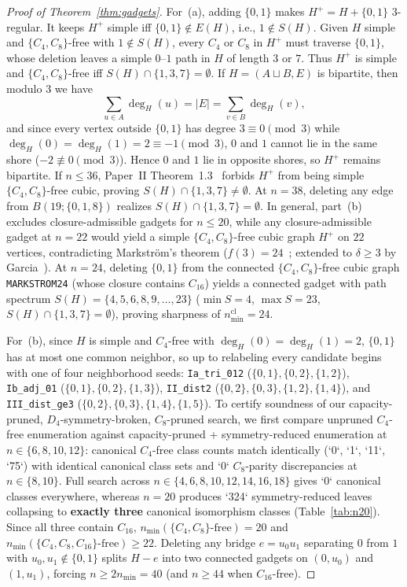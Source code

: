 \documentclass[11pt]{amsart}
\theoremstyle{definition}
\theoremstyle{remark}
\begin{document}
\begin{proof}[Proof of Theorem~\ref{thm:gadgets}]
For~(a), adding $\{0,1\}$ makes $H^+ = H + \{0,1\}$ $3$-regular. It keeps $H^+$ simple iff $\{0,1\} \notin E(H)$, i.e., $1 \notin S(H)$. Given $H$ simple and $\{C_4, C_8\}$-free with $1 \notin S(H)$, every $C_4$ or $C_8$ in $H^+$ must traverse $\{0,1\}$, whose deletion leaves a simple $0\text{--}1$ path in $H$ of length $3$ or $7$. Thus $H^+$ is simple and $\{C_4, C_8\}$-free iff $S(H) \cap \{1,3,7\} = \emptyset$. If $H = (A \sqcup B, E)$ is bipartite, then modulo $3$ we have
\[
\sum_{u \in A} \deg_H(u) = |E| = \sum_{v \in B} \deg_H(v),
\]
and since every vertex outside $\{0,1\}$ has degree $3 \equiv 0 \pmod 3$ while $\deg_H(0) = \deg_H(1) = 2 \equiv -1 \pmod 3$, $0$ and $1$ cannot lie in the same shore ($-2 \not\equiv 0 \pmod 3$). Hence $0$ and $1$ lie in opposite shores, so $H^+$ remains bipartite. If $n \le 36$, Paper~II Theorem~1.3~\cite{Paper2} forbids $H^+$ from being simple $\{C_4, C_8\}$-free cubic, proving $S(H) \cap \{1,3,7\} \ne \emptyset$. At $n = 38$, deleting any edge from $B(19; \{0,1,8\})$ realizes $S(H) \cap \{1,3,7\} = \emptyset$. In general, part~(b) excludes closure-admissible gadgets for $n \le 20$, while any closure-admissible gadget at $n = 22$ would yield a simple $\{C_4, C_8\}$-free cubic graph $H^+$ on $22$ vertices, contradicting Markstr\"om's theorem ($f(3) = 24$~\cite{Markstrom2004}; extended to $\delta \ge 3$ by Garcia~\cite{Garcia2026}). At $n = 24$, deleting $\{0,1\}$ from the connected $\{C_4, C_8\}$-free cubic graph \texttt{MARKSTROM24} (whose closure contains $C_{16}$) yields a connected gadget with path spectrum $S(H) = \{4, 5, 6, 8, 9, \dots, 23\}$ ($\min S = 4$, $\max S = 23$, $S(H) \cap \{1,3,7\} = \emptyset$), proving sharpness of $n_{\min}^{\mathrm{cl}} = 24$.

For~(b), since $H$ is simple and $C_4$-free with $\deg_H(0)=\deg_H(1)=2$, $\{0,1\}$ has at most one common neighbor, so up to relabeling every candidate begins with one of four neighborhood seeds: \texttt{Ia\_tri\_012} ($\{0,1\},\{0,2\},\{1,2\}$), \texttt{Ib\_adj\_01} ($\{0,1\},\{0,2\},\{1,3\}$), \texttt{II\_dist2} ($\{0,2\},\{0,3\},\{1,2\},\{1,4\}$), and \texttt{III\_dist\_ge3} ($\{0,2\},\{0,3\},\{1,4\},\{1,5\}$). To certify soundness of our capacity-pruned, $D_4$-symmetry-broken, $C_8$-pruned search, we first compare unpruned $C_4$-free enumeration against capacity-pruned + symmetry-reduced enumeration at $n \in \{6, 8, 10, 12\}$: canonical $C_4$-free class counts match identically (`0`, `1`, `11`, `75`) with identical canonical class sets and `0` $C_8$-parity discrepancies at $n \in \{8, 10\}$. Full search across $n \in \{4,6,8,10,12,14,16,18\}$ gives `0` canonical classes everywhere, whereas $n = 20$ produces `324` symmetry-reduced leaves collapsing to \textbf{exactly three} canonical isomorphism classes (Table~\ref{tab:n20}). Since all three contain $C_{16}$, \textbf{$n_{\min}(\{C_4, C_8\}\text{-free}) = 20$} and \textbf{$n_{\min}(\{C_4, C_8, C_{16}\}\text{-free}) \ge 22$}. Deleting any bridge $e = u_0 u_1$ separating $0$ from $1$ with $u_0, u_1 \notin \{0,1\}$ splits $H - e$ into two connected gadgets on $(0, u_0)$ and $(1, u_1)$, forcing $n \ge 2 n_{\min} = 40$ (and $n \ge 44$ when $C_{16}$-free).


\end{proof}
\end{document}
